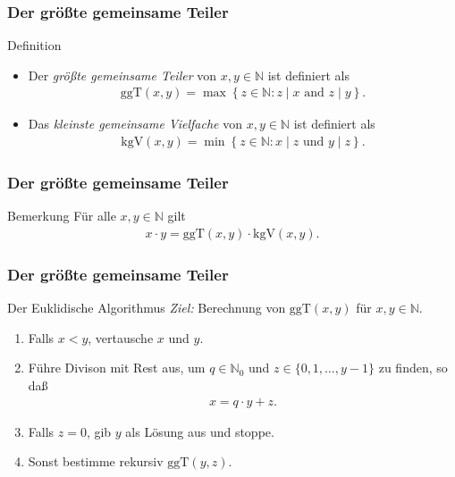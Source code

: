 \documentclass{beamer}
\renewcommand{\emph}[1]{{\textcolor{solarizedRed}{\itshape #1}}}
\newcommand\NN{\mathbb N}
\newcommand\cbc[1]{\left\{{#1}\right\}}
\newcommand{\ggt}{\mathrm{ggT}}
\newcommand{\kgv}{\mathrm{kgV}}
\renewcommand{\oe}{\"o}
\newcommand{\ue}{\"u}
\begin{document}
\begin{frame}\frametitle{Der gr\oe\ss te gemeinsame Teiler}
	\begin{block}{Definition}
		\begin{itemize}
			\item Der \emph{gr\oe\ss te gemeinsame Teiler} von $x,y\in\NN$ ist definiert als
				\begin{align*}
					\ggt(x,y)=\max\cbc{z\in\NN:z\mid x\mbox{ and }z\mid y}.
				\end{align*}
			\item Das \emph{kleinste gemeinsame Vielfache} von $x,y\in\NN$ ist definiert als
				\begin{align*}
					\kgv(x,y)=\min\cbc{z\in\NN:x\mid z\mbox{ und }y\mid z}.
				\end{align*}
		\end{itemize}
	\end{block}
\end{frame}

\begin{frame}\frametitle{Der gr\oe\ss te gemeinsame Teiler}
	\begin{block}{Bemerkung}
		F\ue r alle $x,y\in\NN$ gilt	
		\begin{align*}
			x\cdot y=\ggt(x,y)\cdot\kgv(x,y).
		\end{align*}
	\end{block}
\end{frame}

\begin{frame}\frametitle{Der gr\oe\ss te gemeinsame Teiler}
	\begin{block}{Der Euklidische Algorithmus}
		\emph{Ziel:} Berechnung von $\ggt(x,y)$ f\ue r $x,y\in\NN$.
	\begin{enumerate}
		\item Falls $x<y$, vertausche $x$ und $y$.
		\item F\ue hre Divison mit Rest aus, um $q\in\NN_0$ und $z\in\{0,1,\ldots,y-1\}$ zu finden, so da\ss
			\begin{align*}
			x=q\cdot y+z.
			\end{align*}
		\item Falls $z=0$, gib $y$ als L\oe sung aus und stoppe.
		\item Sonst bestimme rekursiv $\ggt(y,z)$.
	\end{enumerate}
	\end{block}
\end{frame}
\end{document}
